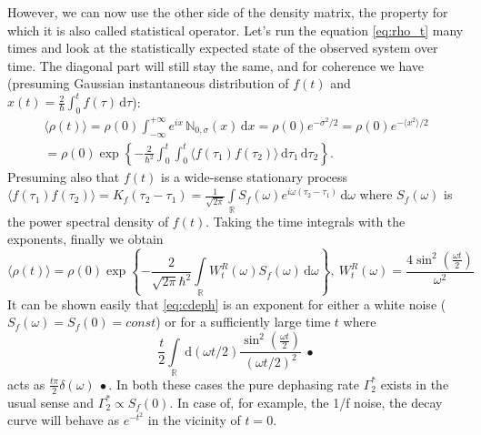 \documentclass[12pt, twoside]{report}
\newcommand{\diff}{\,\mathrm{d}}
\numberwithin{equation}{section}
\begin{document}
However, we can now use the other side of the density matrix, the property for which it is also called statistical operator. Let's run the equation \eqref{eq:rho_t} many times and look at the statistically expected state of the observed system over time. The diagonal part will still stay the same, and for coherence we have (presuming Gaussian instantaneous distribution of $f(t)$ and $x(t) = \frac{2}{\hbar}\int_0^t f(\tau)  \diff \tau$):
\begin{gather}
\langle \rho(t) \rangle = \rho(0) \int_{-\infty}^{+\infty} e^{ix}\, \mathbb{N}_{0,\sigma}(x) \diff x = \rho(0) e^{-\sigma^2/2} = \rho(0) e^{-\langle x^2 \rangle/2} \\
= \rho(0)\exp \left\{ -\frac{2}{\hbar^2}\int_0^t\int_0^t \langle f(\tau_1) f(\tau_2) \rangle \diff \tau_1 \diff \tau_2 \right\}.
\end{gather}
Presuming also that $f(t)$ is a wide-sense stationary process $\langle f(\tau_1) f(\tau_2) \rangle = K_f(\tau_2 - \tau_1) = \frac{1}{\sqrt{2\pi}}\int\limits_\mathbb{R} S_f(\omega) e^{i\omega(\tau_2-\tau_1)}\diff\omega$ where $S_f(\omega)$ is the power spectral density of $f(t)$. Taking the time integrals with the exponents, finally we obtain
\begin{equation}
\langle \rho(t) \rangle = \rho(0) \exp  \left\{-\frac{2}{\sqrt{2\pi}\hbar^2} \int\limits_\mathbb{R} W_t^R(\omega) S_f(\omega)\diff \omega \right\},\  W_t^R(\omega)  = \frac{4 \sin^2(\frac{\omega t}{2})}{\omega^2}\label{eq:cdeph}
\end{equation}
It can be shown easily that \eqref{eq:cdeph} is an exponent for either a white noise ($S_f(\omega) = S_f(0) = const$) or for a sufficiently large time $t$ where 
$$\frac{t}{2}\int\limits_\mathbb{R} \diff(\omega t/2) \frac{\sin^2(\frac{\omega t}{2})}{(\omega t/2)^2} \ \bullet $$
acts as $ \frac{t\pi}{2}\delta(\omega)\ \bullet$. In both these cases the pure dephasing rate $\Gamma^*_2$ exists in the usual sense and $\Gamma^*_2 \propto S_f(0)$. In case of, for example, the 1/f noise, the decay curve will behave as $e^{-t^2}$ in the vicinity of $t=0$.
\end{document}
